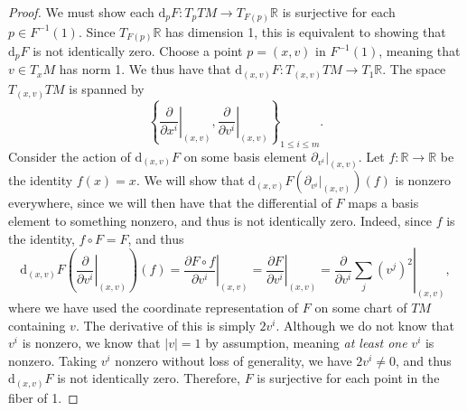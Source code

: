 \documentclass[11pt, letterpaper]{article}
\theoremstyle{plain}
\begin{document}
\begin{proof}
	We must show each $\mathrm{d} _pF : T_pTM \to T_{F(p)}\mathbb{R} $ is surjective for each $p\in F^{-1} (1)$. Since $T_{F(p)} \mathbb{R} $ has dimension 1, this is equivalent to showing that $\mathrm{d}_pF$ is not identically zero. Choose a point $p=(x,v)$ in $F^{-1} (1)$, meaning that $v\in T_xM$ has norm 1. We thus have that $\mathrm{d}_{(x,v)} F : T_{(x,v)} TM \to T_1\mathbb{R} $. The space $T_{(x,v)} TM$ is spanned by
	\[
		\left\{ \left. \frac{\partial }{\partial x^i} \right|_{(x,v)} ,\left.\frac{\partial }{\partial v^i} \right|_{(x,v)}  \right\}_{1\leq i\leq m}
	.\]
	Consider the action of $\mathrm{d}_{(x,v)} F$ on some basis element $\partial_{v^i}|_{(x,v)} $. Let $f : \mathbb{R}  \to \mathbb{R} $ be the identity $f(x)=x$. We will show that $\mathrm{d}_{(x,v)}F (\partial_{v^i} |_{(x,v)} )(f)$ is nonzero everywhere, since we will then have that the differential of $F$ maps a basis element to something nonzero, and thus is not identically zero. Indeed, since $f$ is the identity, $f\circ F=F$, and thus
	\[
		\mathrm{d}_{(x,v)} F\left( \left. \frac{\partial }{\partial v^i} \right|_{(x,v)}  \right) (f)=\left. \frac{\partial F\circ f}{\partial v^i} \right|_{(x,v)} =\left.\frac{\partial F}{\partial v^i}\right|_{(x,v)} =\left. \frac{\partial }{\partial v^i} \sum_j (v^j)^2\right|_{(x,v)} ,
	\]
	where we have used the coordinate representation of $F$ on some chart of $TM$ containing $v$. The derivative of this is simply $2v^i$. Although we do not know that $v^i$ is nonzero, we know that $\left| v \right| =1$ by assumption, meaning \emph{at least one} $v^i$ is nonzero. Taking $v^i$ nonzero without loss of generality, we have $2v^i \neq 0$, and thus $\mathrm{d}_{(x,v)} F$ is not identically zero. Therefore, $F$ is surjective for each point in the fiber of 1.
\end{proof}
\end{document}
